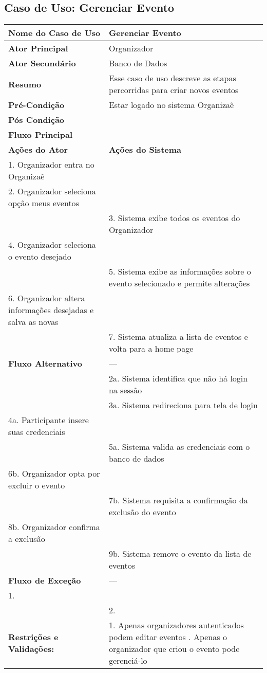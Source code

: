 \documentclass[12pt,a4paper]{article}
\begin{document}
\newpage

\subsection{Caso de Uso: Gerenciar Evento}
\begin{longtable}{|p{4cm}|p{11cm}|}
\hline
\textbf{Nome do Caso de Uso} & Gerenciar Evento \\ \hline
\textbf{Ator Principal} & Organizador \\ \hline
\textbf{Ator Secundário} & Banco de Dados \\ \hline
\textbf{Resumo} & Esse caso de uso descreve as etapas percorridas para criar novos eventos \\ \hline
\textbf{Pré-Condição} & Estar logado no sistema Organizaê \\ \hline
\textbf{Pós Condição} & \\ \hline
\textbf{Fluxo Principal} & \\ \hline
\textbf{Ações do Ator} & \textbf{Ações do Sistema} \\ \hline
1. Organizador entra no Organizaê & \\ \hline
2. Organizador seleciona opção meus eventos & \\ \hline
& 3. Sistema exibe todos os eventos do Organizador \\ \hline
4. Organizador seleciona o evento desejado & \\ \hline
& 5. Sistema exibe as informações sobre o evento selecionado e permite alterações \\ \hline
6. Organizador altera informações desejadas e salva as novas & \\ \hline
& 7. Sistema atualiza a lista de eventos e volta para a home page \\ \hline
\textbf{Fluxo Alternativo} & --- \\ \hline
& 2a. Sistema identifica que não há login na sessão \\ \hline
& 3a. Sistema redireciona para tela de login \\ \hline
4a. Participante insere suas credenciais & \\ \hline
& 5a. Sistema valida as credenciais com o banco de dados \\ \hline
6b. Organizador opta por excluir o evento & \\ \hline
& 7b. Sistema requisita a confirmação da exclusão do evento \\ \hline
8b. Organizador confirma a exclusão & \\ \hline
& 9b. Sistema remove o evento da lista de eventos \\ \hline
\textbf{Fluxo de Exceção} & --- \\ \hline
1. & \\ \hline
& 2. \\ \hline

\textbf{Restrições e Validações:} & 1. Apenas organizadores autenticados podem editar eventos 
\newline 2. Apenas o organizador que criou o evento pode gerenciá-lo \\ \hline
\end{longtable}
\end{document}
